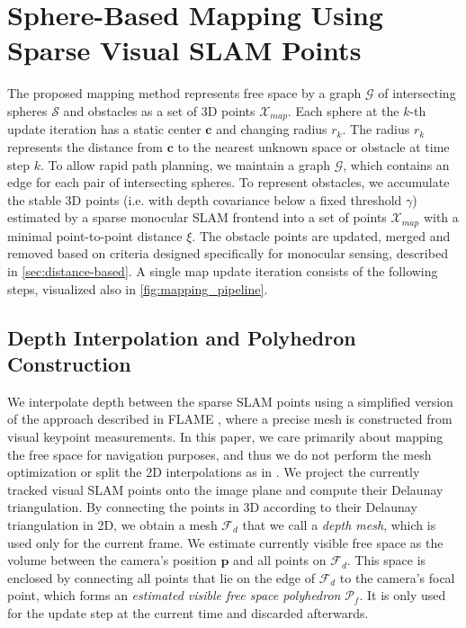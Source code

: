 \documentclass[letterpaper, 10 pt, journal, twoside]{IEEEtran}
\begin{document}
\section{Sphere-Based Mapping Using Sparse Visual SLAM Points}
\label{sec:map_building}
{The proposed mapping method represents free space by a graph $\mathcal{G}$ of intersecting spheres $\mathcal{S}$ and obstacles as a set of 3D points $\mathcal{X}_{map}$.}
Each sphere at the $k$-th update iteration has a static center $\mathbf{c}$ and changing radius $r_k$.
The radius $r_k$ represents the distance from $\mathbf{c}$ to the nearest unknown space or obstacle at time step $k$.
{To allow rapid path planning, we maintain a graph $\mathcal{G}$, which contains an edge for each pair of intersecting spheres.
To represent obstacles, we accumulate the stable 3D points (i.e. with depth covariance below a fixed threshold $\gamma$) estimated by a sparse monocular SLAM frontend into a set of points $\mathcal{X}_{map}$ with a minimal point-to-point distance $\xi$.
The obstacle points are updated, merged and removed based on criteria designed specifically for monocular sensing, described in \autoref{sec:distance-based}.
A single map update iteration consists of the following steps, visualized also in \autoref{fig:mapping_pipeline}.
}
\subsection{Depth Interpolation and Polyhedron Construction}
\label{sec:polyhedron}
{We interpolate depth between the sparse SLAM points using a simplified version of the approach described in FLAME \cite{flame}, where
a precise mesh is constructed from visual keypoint measurements.
In this paper, we care primarily about mapping the free space for navigation purposes, and thus we do not perform the mesh optimization or split the 2D interpolations as in \cite{flame}.
We project the currently tracked visual SLAM points onto the image plane and compute their Delaunay triangulation. 
By connecting the points in 3D according to their Delaunay triangulation in 2D, we obtain a mesh $\mathcal{F}_d$ that we call a \textit{depth mesh}, which is used only for the current frame.
We estimate currently visible free space as the volume between the camera's position $\mathbf{p}$ and all points on $\mathcal{F}_d$.
This space is enclosed by connecting all points that lie on the edge of $\mathcal{F}_d$ to the camera's focal point, which forms an \textit{estimated visible free space polyhedron} $\mathcal{P}_f$.
It is only used for the update step at the current time and discarded afterwards.
}
\end{document}
